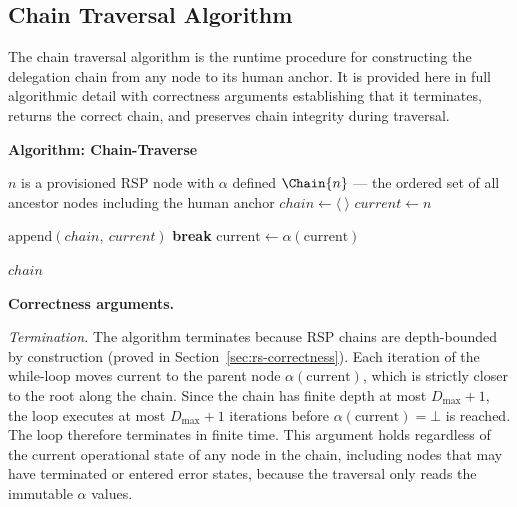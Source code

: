 \subsection{Chain Traversal Algorithm}
\label{sec:chain-traversal-algorithm}

The chain traversal algorithm is the runtime procedure for constructing the delegation chain from any node to its human anchor. It is provided here in full algorithmic detail with correctness arguments establishing that it terminates, returns the correct chain, and preserves chain integrity during traversal.

\bigskip
\noindent\textbf{Algorithm: Chain-Traverse}

\begin{algorithm}
\caption{Chain-Traverse($n$) --- Build the delegation chain from node $n$ to the human anchor}
\label{alg:chain-traverse}
\begin{algorithmic}[1]
\REQUIRE $n$ is a provisioned RSP node with $\alpha$ defined
\ENSURE $\Chain{n}$ --- the ordered set of all ancestor nodes including the human anchor
\STATE $chain \leftarrow \langle\ \rangle$ 
\STATE $current \leftarrow n$ 

    \STATE $\text{append}(chain,\ current)$ 
        \STATE \textbf{break} 
    \ENDIF
    \STATE $\text{current} \leftarrow \alpha(\text{current})$ 
\ENDWHILE

\RETURN $chain$
\end{algorithmic}
\end{algorithm}

\bigskip
\noindent\textbf{Correctness arguments.}

\textit{Termination.} The algorithm terminates because RSP chains are depth-bounded by construction (proved in Section~\ref{sec:rs-correctness}). Each iteration of the while-loop moves $\text{current}$ to the parent node $\alpha(\text{current})$, which is strictly closer to the root along the chain. Since the chain has finite depth at most $D_{\max} + 1$, the loop executes at most $D_{\max} + 1$ iterations before $\alpha(\text{current}) = \bot$ is reached. The loop therefore terminates in finite time. This argument holds regardless of the current operational state of any node in the chain, including nodes that may have terminated or entered error states, because the traversal only reads the immutable $\alpha$ values.

